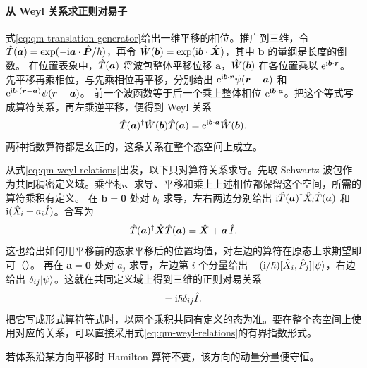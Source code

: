 \paragraph{从 Weyl 关系求正则对易子}
式\eqref{eq:qm-translation-generator}给出一维平移的相位。推广到三维，令 $\hat{T}(\bm a) = \exp(-\mathrm{i}\bm a \cdot \hat{\bm{P}}/\hbar)$，再令 $\hat{W}(\bm b) = \exp(\mathrm{i}\bm b \cdot \hat{\bm{X}})$，其中 $\bm b$ 的量纲是长度的倒数。
在位置表象中，$\hat{T}(\bm a)$ 将波包整体平移位移 $\bm a$，$\hat{W}(\bm b)$ 在各位置乘以 $\mathop{}\!\mathrm{e}^{\mathrm{i}\bm b\cdot\bm r}$。
先平移再乘相位，与先乘相位再平移，分别给出 $\mathop{}\!\mathrm{e}^{\mathrm{i}\bm b\cdot\bm r}\psi(\bm r - \bm a)$ 和 $\mathop{}\!\mathrm{e}^{\mathrm{i}\bm b\cdot(\bm r-\bm a)}\psi(\bm r-\bm a)$。
前一个波函数等于后一个乘上整体相位 $\mathop{}\!\mathrm{e}^{\mathrm{i}\bm b\cdot\bm a}$。把这个等式写成算符关系，再左乘逆平移，便得到 Weyl 关系\cite[第 8.1 节]{teschl-forms}
\begin{equation}\label{eq:qm-weyl-relations}
    \hat{T}(\bm a)^\dagger \hat{W}(\bm b)\hat{T}(\bm a)
        = \mathop{}\!\mathrm{e}^{\mathrm{i}\bm b\cdot\bm a}\hat{W}(\bm b).
\end{equation}
两种指数算符都是幺正的，这条关系在整个态空间上成立。

从式\eqref{eq:qm-weyl-relations}出发，以下只对算符关系求导。先取 Schwartz 波包作为共同稠密定义域。乘坐标、求导、平移和乘上上述相位都保留这个空间，所需的算符乘积有定义。
在 $\bm b = \bm 0$ 处对 $b_i$ 求导，左右两边分别给出 $\mathrm{i}\hat{T}(\bm a)^\dagger \hat{X}_i\hat{T}(\bm a)$ 和 $\mathrm{i}(\hat{X}_i + a_i\hat{I})$。合写为
\begin{equation}\label{eq:qm-translated-position}
    \hat{T}(\bm a)^\dagger\hat{\bm{X}} \hat{T}(\bm a) = \hat{\bm{X}} + \bm a\,\hat{I} .
\end{equation}
这也给出如何用平移前的态求平移后的位置均值，对左边的算符在原态上求期望即可（）。
再在 $\bm a = \bm 0$ 处对 $a_j$ 求导，左边第 $i$ 个分量给出 $-(\mathrm{i}/\hbar)[\hat{X}_i,\hat{P}_j]\lvert\psi\rangle$，右边给出 $\delta_{ij}\lvert\psi\rangle$。这就在共同定义域上得到三维的正则对易关系
\begin{equation}
    [\op X_i,\op P_j] = \i\hbar\delta_{ij}\one.
\end{equation}
把它写成形式算符等式时，以两个乘积共同有定义的态为准。要在整个态空间上使用对应的关系，可以直接采用式\eqref{eq:qm-weyl-relations}的有界指数形式。

若体系沿某方向平移时 Hamilton 算符不变，该方向的动量分量便守恒。

